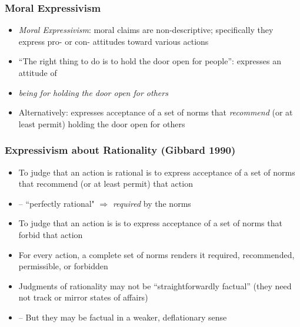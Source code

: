 \begin{frame}
\frametitle{Moral Expressivism}

\begin{itemize}[<+->]

\item \emph{Moral Expressivism}: moral claims are non-descriptive; specifically they express pro- or con- attitudes toward various actions

\item ``The right thing to do is to hold the door open for people'': expresses an attitude of

\item[]  \textit{being for holding the door open for others} 

\item Alternatively: expresses acceptance of a set of norms that \textit{recommend} (or at least permit) holding the door open for others

\end{itemize}
\end{frame}

\begin{frame}
\frametitle{Expressivism about Rationality (Gibbard 1990)}

\begin{itemize}[<+->]

\item To judge that an action is rational is to express acceptance of a set of norms that recommend (or at least permit) that action

\item[] -- ``\textcolor{highlightA}{perfectly rational}" $\Rightarrow$ \emph{required} by the norms

\item To judge that an action is  is to express acceptance of a set of norms that \textcolor{OGlyallpink}{forbid} that action

\item For every action, a complete set of norms renders it required, recommended, permissible, or forbidden 

\item Judgments of rationality may not be ``straightforwardly factual'' (they need not track or mirror states of affairs)
\item[] -- But they may be factual in a weaker, deflationary sense 


\end{itemize}
\end{frame}

